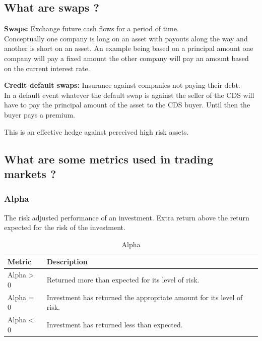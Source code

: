 \documentclass[11pt]{scrartcl} %
\begin{document}
\subsection{What are swaps ?}

\textbf{Swaps:} Exchange future cash flows for a period of time.\\

Conceptually one company is long on an asset with payouts along the way and another is short on an asset. An example being based on a principal amount one company will pay a fixed amount the other company will pay an amount based on the current interest rate.

\textbf{Credit default swaps:} Insurance against companies not paying their debt.\\

In a default event whatever the default swap is against the seller of the CDS will have to pay the principal amount of the asset to the CDS buyer. Until then the buyer pays a premium.

This is an effective hedge against perceived high risk assets.

\subsection{What are some metrics used in trading markets ?}

\subsubsection{Alpha}

The risk adjusted performance of an investment. Extra return above the return expected for the risk of the investment. 

\begin{table}[h] %
	\centering %
	\begin{tabular}{l l}
		\toprule
		\textbf{Metric} & \textbf{Description} \\
		\midrule
		Alpha > 0 & Returned more than expected for its level of risk.\\
		Alpha = 0 & Investment has returned the appropriate amount for its level of risk.\\
		Alpha < 0 & Investment has returned less than expected. \\
		\bottomrule
	\end{tabular}
	\caption{Alpha}
\end{table}
\end{document}
